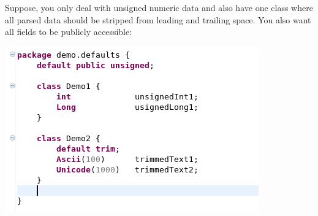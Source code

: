 \documentclass[11pt,a4paper,oneside]{article}
\begin{document}
Suppose, you only deal with unsigned numeric data and also have one class where all parsed data should be stripped from leading and trailing space.
You also want all fields to be publicly accessible:

\vspace{2mm}

\hspace{1cm}\includegraphics[scale=0.5]{images/tut1-009-defaults.png}
\end{document}
